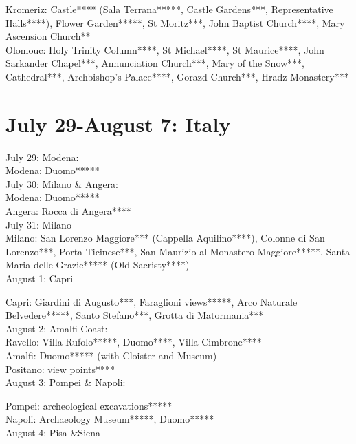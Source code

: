 Kromeriz: Castle**** (Sala Terrana*****, Castle Gardens***, Representative Halls****), Flower Garden*****, St Moritz***, John Baptist Church****,  Mary Ascension Church**\\
Olomouc: Holy Trinity Column****, St Michael****, St Maurice****, John Sarkander Chapel***, Annunciation Church***, Mary of the Snow***, Cathedral***, Archbishop's Palace****, Gorazd Church***, Hradz Monastery***\\


\section{July 29-August 7:  Italy}
\label{2022:Italy}

July 29: Modena: \\

Modena: Duomo*****\\

July 30: Milano \& Angera: \\

Modena: Duomo*****\\
Angera: Rocca di Angera****\\

July 31: Milano\\

Milano: San Lorenzo Maggiore*** (Cappella Aquilino****), Colonne di San Lorenzo***, Porta Ticinese***, San Maurizio al Monastero Maggiore*****, Santa Maria delle Grazie***** (Old Sacristy****)\\

August 1: Capri

Capri: Giardini di Augusto***, Faraglioni views*****, Arco Naturale Belvedere*****, Santo Stefano***, Grotta di Matormania***\\

August 2: Amalfi Coast:\\

Ravello: Villa Rufolo*****, Duomo****, Villa Cimbrone****\\
Amalfi: Duomo***** (with Cloister and Museum)\\
Positano: view points****\\

August 3: Pompei \& Napoli:

Pompei: archeological excavations*****\\
Napoli: Archaeology Museum*****, Duomo*****\\

August 4: Pisa \&Siena\\

